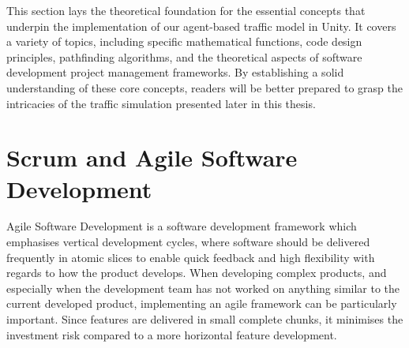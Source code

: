 
This section lays the theoretical foundation for the essential concepts that underpin the implementation of our agent-based traffic model in Unity. It covers a variety of topics, including specific mathematical functions, code design principles, pathfinding algorithms, and the theoretical aspects of software development project management frameworks. By establishing a solid understanding of these core concepts, readers will be better prepared to grasp the intricacies of the traffic simulation presented later in this thesis.









\section{Scrum and Agile Software Development}
    Agile Software Development is a software development framework which emphasises vertical development cycles, where software should be delivered frequently in atomic slices to enable quick feedback and high flexibility with regards to how the product develops. When developing complex products, and especially when the development team has not worked on anything similar to the current developed product, implementing an agile framework can be particularly important. Since features are delivered in small complete chunks, it minimises the investment risk compared to a more horizontal feature development.






